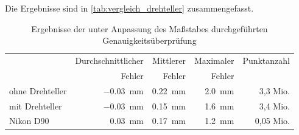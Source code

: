 \documentclass[./00PhotoBox.tex]{subfiles}
\begin{document}
Die Ergebnisse sind in \autoref{tab:vergleich_drehteller} zusammengefasst.

\begin{table}
    \centering
    \caption{Ergebnisse der unter Anpassung des Maßstabes durchgeführten Genauigkeitsüberprüfung}
    \label{tab:vergleich_drehteller}
    \begin{tabular}{l|r|r|r|r}
        \toprule
                        & Durchschnittlicher       & Mittlerer               & Maximaler              & Punktanzahl \\
                        & Fehler                   & Fehler                  & Fehler                 &             \\
        \midrule
        ohne Drehteller & \SI{-0,03}{\milli\metre} & \SI{0,22}{\milli\metre} & \SI{2,0}{\milli\metre} & 3,3 Mio.    \\
        mit Drehteller  & \SI{-0,03}{\milli\metre} & \SI{0,15}{\milli\metre} & \SI{1,6}{\milli\metre} & 3,4 Mio.    \\
        Nikon D90       & \SI{0,03}{\milli\metre}  & \SI{0,17}{\milli\metre} & \SI{1,2}{\milli\metre} & 0,05 Mio.   \\
        \bottomrule
    \end{tabular}
\end{table}
\end{document}
